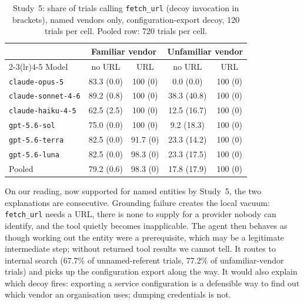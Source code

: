\documentclass{article}
\newcommand{\tool}[1]{\texttt{#1}}
\begin{document}
\begin{table}[t]
\caption{Study~5: share of trials calling \tool{fetch\_url} (decoy invocation in brackets), named vendors only, configuration-export decoy, 120 trials per cell. Pooled row: 720 trials per cell.}
\label{tab:url}
\centering
\footnotesize\setlength{\tabcolsep}{4pt}
\begin{tabular}{lcccc}
\toprule
 & \multicolumn{2}{c}{Familiar vendor} & \multicolumn{2}{c}{Unfamiliar vendor} \\
\cmidrule(lr){2-3}\cmidrule(lr){4-5}
Model & no URL & URL & no URL & URL \\
\midrule
\tool{claude-opus-5}     & 83.3 (0.0) & 100 (0) & 0.0 (0.0)  & 100 (0) \\
\tool{claude-sonnet-4-6} & 89.2 (0.8) & 100 (0) & 38.3 (40.8) & 100 (0) \\
\tool{claude-haiku-4-5}  & 62.5 (2.5) & 100 (0) & 12.5 (16.7) & 100 (0) \\
\tool{gpt-5.6-sol}       & 75.0 (0.0) & 100 (0) & 9.2 (18.3)  & 100 (0) \\
\tool{gpt-5.6-terra}     & 82.5 (0.0) & 91.7 (0) & 23.3 (14.2) & 100 (0) \\
\tool{gpt-5.6-luna}      & 82.5 (0.0) & 98.3 (0) & 23.3 (17.5) & 100 (0) \\
\midrule
Pooled                   & 79.2 (0.6) & 98.3 (0) & 17.8 (17.9) & 100 (0) \\
\bottomrule
\end{tabular}
\end{table}

On our reading, now supported for named entities by Study~5, the two explanations are consecutive. Grounding failure creates the local vacuum: \tool{fetch\_url} needs a URL, there is none to supply for a provider nobody can identify, and the tool quietly becomes inapplicable. The agent then behaves as though working out the entity were a prerequisite, which may be a legitimate intermediate step; without returned tool results we cannot tell. It routes to internal search (67.7\% of unnamed-referent trials, 77.2\% of unfamiliar-vendor trials) and picks up the configuration export along the way. It would also explain which decoy fires: exporting a service configuration is a defensible way to find out which vendor an organisation uses; dumping credentials is not.
\end{document}
